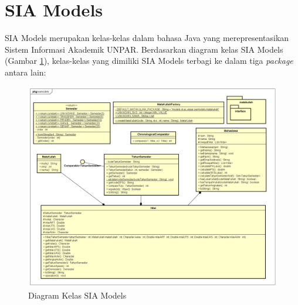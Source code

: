 \section{SIA Models}
\label{sec:siamodels}
SIA Models merupakan kelas-kelas dalam bahasa Java yang merepresentasikan Sistem Informasi Akademik UNPAR\cite{siamodels}. Berdasarkan diagram kelas SIA Models (Gambar \ref{fig:2_siamodels_class}), kelas-kelas yang dimiliki SIA Models terbagi ke dalam tiga \textit{package} antara lain:

\begin{figure}[H]
	\centering
	\includegraphics[scale=0.35]{Gambar/siamodels-class}
	\caption{Diagram Kelas SIA Models} 
	\label{fig:2_siamodels_class}
\end{figure}

